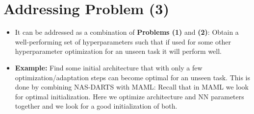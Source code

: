 \section{Addressing Problem (3)}\label{sec:problem:3}
\begin{itemize}
	\item It can be addressed as a combination of \textbf{Problems (1)} and \textbf{(2)}: Obtain a well-performing set of hyperparameters such that if used for some other hyperparameter optimization for an unseen task it will perform well.
	\item \textbf{Example:} Find some initial architecture that with only a few optimization/adaptation steps can become optimal for an unseen task.
	This is done by combining NAS-DARTS with MAML: Recall that in MAML we look for optimal initialization. Here we optimize architecture and NN parameters together and we look for a good initialization of both.
	

\end{itemize}
